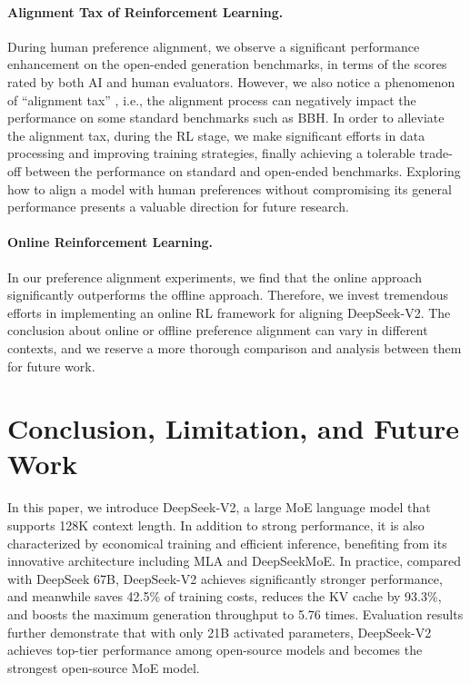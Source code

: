 \paragraph{Alignment Tax of Reinforcement Learning.} During human preference alignment, we observe a significant performance enhancement on the open-ended generation benchmarks, in terms of the scores rated by both AI and human evaluators. However, we also notice a phenomenon of ``alignment tax'' \citep{ouyang2022training}, i.e., the alignment process can negatively impact the performance on some standard benchmarks such as BBH. In order to alleviate the alignment tax, during the RL stage, we make significant efforts in data processing and improving training strategies, finally achieving a tolerable trade-off between the performance on standard and open-ended benchmarks. Exploring how to align a model with human preferences without compromising its general performance presents a valuable direction for future research.

\paragraph{Online Reinforcement Learning.} In our preference alignment experiments, we find that the online approach significantly outperforms the offline approach. Therefore, we invest tremendous efforts in implementing an online RL framework for aligning DeepSeek-V2. The conclusion about online or offline preference alignment can vary in different contexts, and we reserve a more thorough comparison and analysis between them for future work.

\section{Conclusion, Limitation, and Future Work}
\label{sec:conclusion}

In this paper, we introduce DeepSeek-V2, a large MoE language model that supports 128K context length. In addition to strong performance, it is also characterized by economical training and efficient inference, benefiting from its innovative architecture including MLA and DeepSeekMoE. In practice, compared with DeepSeek 67B, DeepSeek-V2 achieves significantly stronger performance, and meanwhile saves 42.5\% of training costs, reduces the KV cache by 93.3\%, and boosts the maximum generation throughput to 5.76 times. Evaluation results further demonstrate that with only 21B activated parameters, DeepSeek-V2 achieves top-tier performance among open-source models and becomes the strongest open-source MoE model. 

